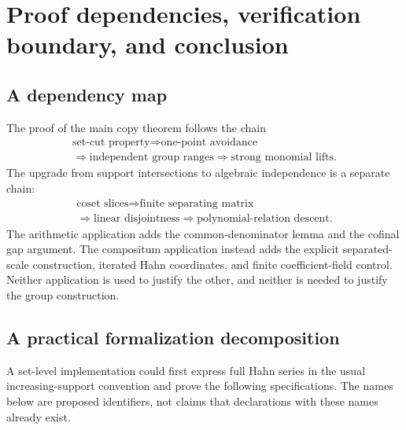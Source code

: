 \documentclass[11pt,letterpaper]{article}
\theoremstyle{definition}
\theoremstyle{remark}
\numberwithin{equation}{section}
\begin{document}
\section{Proof dependencies, verification boundary, and conclusion}
\label{isc:sec:audit}

\subsection{A dependency map}

The proof of the main copy theorem follows the chain
\[
\begin{gathered}
 \text{set-cut property}
 \Longrightarrow\text{one-point avoidance}\\
 \Longrightarrow\text{independent group ranges}
 \Longrightarrow\text{strong monomial lifts}.
\end{gathered}
\]
The upgrade from support intersections to algebraic independence is a
separate chain:
\[
\begin{gathered}
 \text{coset slices}
 \Longrightarrow\text{finite separating matrix}\\
 \Longrightarrow\text{linear disjointness}
 \Longrightarrow\text{polynomial-relation descent}.
\end{gathered}
\]
The arithmetic application adds the common-denominator lemma and the
cofinal gap argument. The compositum application instead adds the explicit
separated-scale construction, iterated Hahn coordinates, and finite
coefficient-field control. Neither application is used to justify the other,
and neither is needed to justify the group construction.

\subsection{A practical formalization decomposition}\label{isc:sub:formal}

A set-level implementation could first express full Hahn series in the
usual increasing-support convention and prove the following specifications.
The names below are proposed identifiers, not claims that declarations with
these names already exist.
\end{document}
